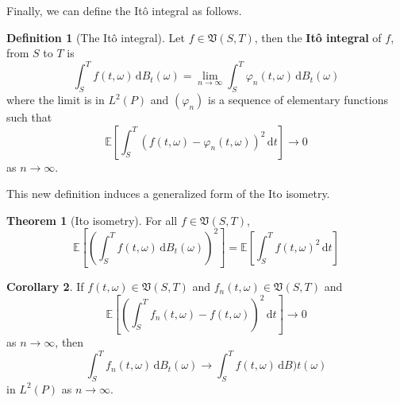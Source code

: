 \documentclass[12pt,a4paper]{article}
\theoremstyle{definition}
\newtheorem{theorem}{Theorem}[section]
\newtheorem{corollary}[theorem]{Corollary}
\newtheorem{definition}{Definition}[section]
\begin{document}
Finally, we can define the Itô integral as follows.

\begin{definition}[The Itô integral]
	Let $f \in \mathfrak{V}(S,T)$, then the \textbf{Itô integral} of $f$, from $S$ to $T$ is
	\[
		\int_S^T f(t, \omega) \, \mathrm{d}B_t(\omega) = \lim_{n \to \infty} \int_S^T \varphi_n (t, \omega)  \, \mathrm{d}B_t(\omega)
	\]
	where the limit is in $L^2(P)$ and $(\varphi_n)$ is a sequence of elementary functions such that
	\[
		\mathbb{E} \left[ \int_S^T (f(t, \omega) - \varphi_n(t, \omega))^2 \, \mathrm{d}t \right] \longrightarrow 0
	\] 
	as $n \to \infty$.
\end{definition}

This new definition induces a generalized form of the Ito isometry.

\begin{theorem}[Ito isometry]
	For all $f \in \mathfrak{V}(S,T)$,	
	\[
		\mathbb{E}\left[\left( \int_S^T f(t,\omega) \, \mathrm{d}B_t(\omega) \right)^2 \right] = \mathbb{E} \left[\int_S^T f(t,\omega)^2 \, \mathrm{d}t \right]
	\]
\end{theorem}

\begin{corollary}
	If $f(t, \omega) \in \mathfrak{V}(S,T)$ and $f_n(t, \omega) \in \mathfrak{V}(S,T)$ and
	\[
		\mathbb{E}\left[\left( \int_S^T f_n(t,\omega) - f(t, \omega) \right)^2 \, \mathrm{d}t \right] \longrightarrow 0
		\]
	as $n \to \infty$, then
	\[
		\int_S^T f_n(t, \omega) \, \mathrm{d}B_t(\omega) \longrightarrow \int_S^T f(t, \omega) \, \mathrm{d} B)t(\omega)
	\]
	in $L^2(P)$ as $n \to \infty$.
\end{corollary}
\end{document}
